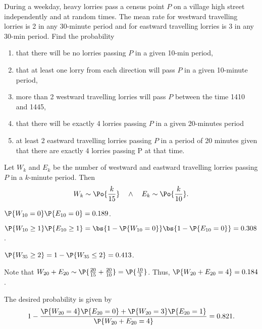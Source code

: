 \begin{problem}
    During a weekday, heavy lorries pass a census point $P$ on a village high street independently and at random times. The mean rate for westward travelling lorries is 2 in any 30-minute period and for eastward travelling lorries is 3 in any 30-min period. Find the probability

    \begin{enumerate}
        \item that there will be no lorries passing $P$ in a given 10-min period,
        \item that at least one lorry from each direction will pass $P$ in a given 10-minute period,
        \item more than 2 westward travelling lorries will pass $P$ between the time 1410 and 1445,
        \item that there will be exactly 4 lorries passing $P$ in a given 20-minutes period
        \item at least 2 eastward travelling lorries passing $P$ in a period of 20 minutes given that there are exactly 4 lorries passing P at that time.
    \end{enumerate}
\end{problem}
\begin{solution}
    Let $W_k$ and $E_k$ be the number of westward and eastward travelling lorries passing $P$ in a $k$-minute period. Then \[W_k \sim \Po{\frac{k}{15}} \quad \land \quad E_k \sim \Po{\frac{k}{10}}.\]
    \begin{ppart}
        $\P{W_{10} = 0} \P{E_{10} = 0} = 0.189$.
    \end{ppart}
    \begin{ppart}
        $\P{W_{10} \geq 1} \P{E_{10} \geq 1} = \bs{1 - \P{W_{10} = 0}} \bs{1 - \P{E_{10} = 0}} = 0.308$.
    \end{ppart}
    \begin{ppart}
        $\P{W_{35} \geq 2} = 1 - \P{W_{35} \leq 2} = 0.413$.
    \end{ppart}
    \begin{ppart}
        Note that $W_{20} + E_{20} \sim \P{\frac{20}{15} + \frac{20}{10}} = \P{\frac{10}{3}}$. Thus, $\P{W_{20} + E_{20} = 4} = 0.184$.
    \end{ppart}
    \begin{ppart}
        The desired probability is given by \[1 - \frac{\P{W_{20} = 4}\P{E_{20} = 0} + \P{W_{20} = 3}\P{E_{20} = 1}}{\P{W_{20} + E_{20} = 4}} = 0.821.\]
    \end{ppart}
\end{solution}

